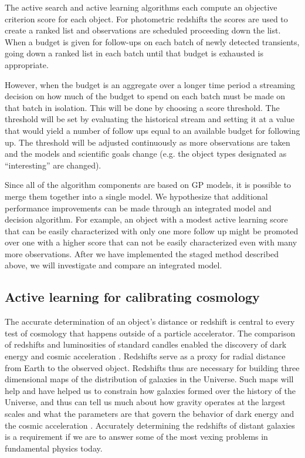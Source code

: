 \documentclass[useAMS,usenatbib,tightenlines,11pt,preprint]{aastex}
\begin{document}
The active search and active learning algorithms each compute an objective
criterion score for each object.  For photometric redshifts the scores are
used to create a ranked list and observations are scheduled proceeding down
the list.  When a budget is given for follow-ups on each batch of newly
detected transients, going down a ranked list in each batch until that
budget is exhausted is appropriate.

However, when the budget is an aggregate over a longer time period a
streaming decision on how much of the budget to spend on each batch must be
made on that batch in isolation.  This will be done by choosing a score
threshold.  The threshold will be set by evaluating the historical stream
and setting it at a value that would yield a number of follow ups equal to
an available budget for following up.  The threshold will be adjusted
continuously as more observations are taken and the models and scientific
goals change (e.g. the object types designated as ``interesting'' are
changed).

Since all of the algorithm components are based on GP models, it is
possible to merge them together into a single model.  We hypothesize that
additional performance improvements can be made through an integrated model
and decision algorithm.  For example, an object with a modest active
learning score that can be easily characterized with only one more follow
up might be promoted over one with a higher score that can not be easily
characterized even with many more observations.  After we have implemented
the staged method described above, we will investigate and compare an
integrated model.



\subsection{Active learning for calibrating cosmology}
\label{sec:photoz}

The accurate determination of an object's distance or redshift is
central to every test of cosmology that happens outside of a particle
accelerator.  The comparison of redshifts and luminosities of standard
candles enabled the discovery of dark energy and cosmic acceleration
\cite{perlmutter1998}. Redshifts serve as a proxy for radial distance
from Earth to the observed object.  Redshifts thus are necessary for
building three dimensional maps of the distribution of galaxies in the
Universe.  Such maps will help and have helped us to constrain how
galaxies formed over the history of the Universe, and thus can tell us
much about how gravity operates at the largest scales and what the
parameters are that govern the behavior of dark energy and the cosmic
acceleration \cite{muvarpi2,roland,sudeep}.  Accurately determining the redshifts of
distant galaxies is a requirement if we are to answer some of the most
vexing problems in fundamental physics today.
\end{document}
